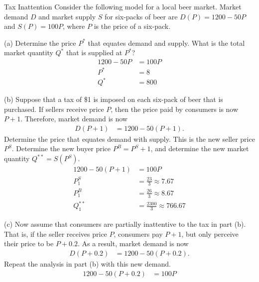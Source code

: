 \documentclass[8pt]{extarticle}
\begin{document}
  \begin{problem}{Tax Inattention}
    Consider the following model for a local beer market. Market demand $D$ and market supply $S$ for six-packs of beer are $D(P) = 1200 - 50P$ and $S(P) = 100P$, where $P$ is the price of a six-pack.
    \tcblower
    \begin{problem}{(a)}
      Determine the price $P^{\ast}$ that equates demand and supply. What is the total market quantity $Q^{\ast}$ that is supplied at $P^{\ast}$?
      \tcblower
      \begin{align*}
        1200 - 50P &= 100P\\
        P^{\ast} &= 8\\
        Q^{\ast} &= 800
      \end{align*}
    \end{problem}
    \begin{problem}{(b)}
      Suppose that a tax of \$1 is imposed on each six-pack of beer that is purchased. If sellers receive price $P$, then the price paid by consumers is now $P+1$. Therefore, market demand is now
      \begin{align*}
        D(P+1) &= 1200 - 50(P+1).
      \end{align*}
      Determine the price that equates demand with supply. This is the new seller price $P^{S}$. Determine the new buyer price $P^{B} = P^{S} + 1$, and determine the new market quantity $Q^{\ast\ast} = S\left(P^{S}\right)$.
      \tcblower
      \begin{align*}
        1200 - 50(P+1) &= 100P\\
        P^{S}_{1} &= \frac{23}{3} \approx 7.67\\
        P^{B}_{1} &= \frac{26}{3} \approx 8.67\\
        Q^{\ast\ast}_{1} &= \frac{2300}{3} \approx 766.67
      \end{align*}
    \end{problem}
    \begin{problem}{(c)}
      Now assume that consumers are partially inattentive to the tax in part (b). That is, if the seller receives price $P$, consumers pay $P+1$, but only perceive their price to be $P + 0.2$. As a result, market demand is now
      \begin{align*}
        D(P+0.2) &= 1200-50(P + 0.2).
      \end{align*}
      Repeat the analysis in part (b) with this new demand.
      \tcblower
      \begin{align*}
        1200-50(P + 0.2) &= 100P\\

\end{align*}
\end{problem}
\end{problem}
\end{document}
